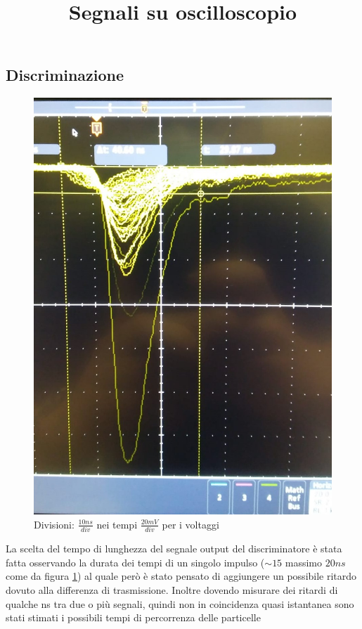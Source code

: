 \documentclass[a4paper]{article}
\begin{document}
\subsection{Discriminazione}
\label{sec:DiscrSegn}
\begin{figure}[H]
\centering
\title{Segnali su oscilloscopio}
\begin{center}
\includegraphics[scale=0.2]{./immagini/TimeOfFlight/SegnaliOsc.jpg}
\caption{Divisioni: $\frac{10ns}{div}$ nei tempi $\frac{20mV}{div}$ per i voltaggi}
\label{fig:SegnaliOsc}
\end{center}
\end{figure}

La scelta del tempo di lunghezza del segnale output del discriminatore è stata fatta osservando la durata dei tempi di un singolo impulso ($\sim 15$ massimo $20 ns$ come da figura \ref{fig:SegnaliOsc}) al quale però è stato pensato di aggiungere un possibile ritardo dovuto alla differenza di trasmissione. Inoltre dovendo misurare dei ritardi di qualche ns tra due o più segnali, quindi non in coincidenza quasi istantanea sono stati stimati i possibili tempi di percorrenza delle particelle
\end{document}
